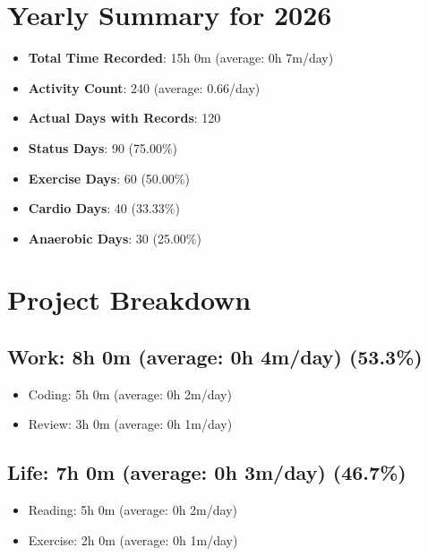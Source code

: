 \documentclass[12pt]{extarticle}
\begin{document}
{\fontsize{18}{21.6}\selectfont\section*{Yearly Summary for 2026}}

\begin{itemize}[topsep=0pt, itemsep=-0.5ex]
    \item \textbf{Total Time Recorded}: 15h 0m (average: 0h 7m/day)
    \item \textbf{Activity Count}: 240 (average: 0.66/day)
    \item \textbf{Actual Days with Records}: 120
    \item \textbf{Status Days}: 90 (75.00\%)
    \item \textbf{Exercise Days}: 60 (50.00\%)
    \item \textbf{Cardio Days}: 40 (33.33\%)
    \item \textbf{Anaerobic Days}: 30 (25.00\%)
\end{itemize}

{\fontsize{16}{19.2}\selectfont\section*{Project Breakdown}}

{\fontsize{16}{19.2}\selectfont\subsection*{Work: 8h 0m (average: 0h 4m/day) (53.3\%)}}
\begin{itemize}[topsep=0pt, itemsep=-0.5ex]
    \item Coding: 5h 0m (average: 0h 2m/day)
    \item Review: 3h 0m (average: 0h 1m/day)
\end{itemize}
{\fontsize{16}{19.2}\selectfont\subsection*{Life: 7h 0m (average: 0h 3m/day) (46.7\%)}}
\begin{itemize}[topsep=0pt, itemsep=-0.5ex]
    \item Reading: 5h 0m (average: 0h 2m/day)
    \item Exercise: 2h 0m (average: 0h 1m/day)
\end{itemize}
\end{document}
